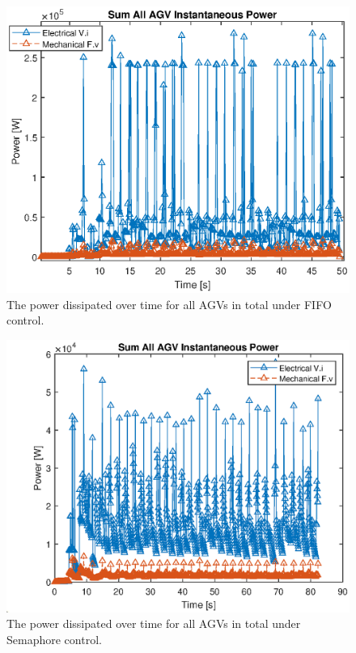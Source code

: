 \documentclass[]{article}
\begin{document}
\begin{figure}
	\includegraphics[width=1.0\linewidth]{fifo_power_recalc_sum_all_agv.eps}
	\caption{The power dissipated over time for all AGVs in total under FIFO control.}
	\label{fig:fifo_power_sum}       %
\end{figure}
\begin{figure}
	\includegraphics[width=1.0\linewidth]{semaphore_power_recalc_sum_all_agv.eps}
	\caption{The power dissipated over time for all AGVs in total under Semaphore control.}
	\label{fig:semaphore_power_sum}       %
\end{figure}


\end{document}
